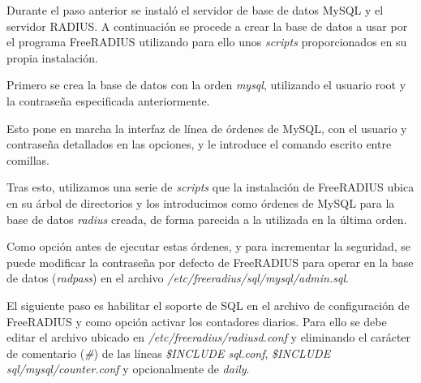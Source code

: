 Durante el paso anterior se instaló el servidor de base de datos MySQL y el servidor RADIUS. A continuación se procede a crear la base de datos a usar por el programa FreeRADIUS utilizando para ello unos \emph{scripts} proporcionados en su propia instalación.

Primero se crea la base de datos con la orden \emph{mysql}, utilizando el usuario root y la contraseña especificada anteriormente.


Esto pone en marcha la interfaz de línea de órdenes de MySQL, con el usuario y contraseña detallados en las opciones, y le introduce el comando escrito entre comillas.

Tras esto, utilizamos una serie de \emph{scripts} que la instalación de FreeRADIUS ubica en su árbol de directorios y los introducimos como órdenes de MySQL para la base de datos \emph{radius} creada, de forma parecida a la utilizada en la última orden.


Como opción antes de ejecutar estas órdenes, y para incrementar la seguridad, se puede modificar la contraseña por defecto de FreeRADIUS para operar en la base de datos (\emph{radpass}) en el archivo \emph{/etc/freeradius/sql/mysql/admin.sql}.

El siguiente paso es habilitar el soporte de SQL en el archivo de configuración de FreeRADIUS y como opción activar los contadores diarios. Para ello se debe editar el archivo ubicado en \emph{/etc/freeradius/radiusd.conf} y eliminando el carácter de comentario (\emph{\#}) de las líneas \emph{\$INCLUDE sql.conf}, \emph{\$INCLUDE sql/mysql/counter.conf} y opcionalmente de \emph{daily}.


